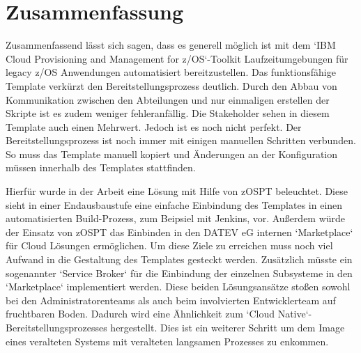 \chapter{Zusammenfassung}\label{ch:zusammenfassung}
Zusammenfassend lässt sich sagen, dass es generell möglich ist mit dem `IBM Cloud Provisioning and Management for z/OS`-Toolkit Laufzeitumgebungen für legacy z/OS Anwendungen automatisiert bereitzustellen.
Das funktionsfähige Template verkürzt den Bereitstellungsprozess deutlich.
Durch den Abbau von Kommunikation zwischen den Abteilungen und nur einmaligen erstellen der Skripte ist es zudem weniger fehleranfällig.
Die Stakeholder sehen in diesem Template auch einen Mehrwert.
Jedoch ist es noch nicht perfekt.
Der Bereitstellungsprozess ist noch immer mit einigen manuellen Schritten verbunden.
So muss das Template manuell kopiert und Änderungen an der Konfiguration müssen innerhalb des Templates stattfinden.

Hierfür wurde in der Arbeit eine Lösung mit Hilfe von zOSPT beleuchtet.
Diese sieht in einer Endausbaustufe eine einfache Einbindung des Templates in einen automatisierten Build-Prozess, zum Beipsiel mit Jenkins, vor.
Außerdem würde der Einsatz von zOSPT das Einbinden in den DATEV eG internen `Marketplace` für Cloud Lösungen ermöglichen.
Um diese Ziele zu erreichen muss noch viel Aufwand in die Gestaltung des Templates gesteckt werden.
Zusätzlich müsste ein sogenannter `Service Broker` für die Einbindung der einzelnen Subsysteme in den `Marketplace` implementiert werden.
Diese beiden Lösungsansätze stoßen sowohl bei den Administratorenteams als auch beim involvierten Entwicklerteam auf fruchtbaren Boden.
Dadurch wird eine Ähnlichkeit zum `Cloud Native`-Bereitstellungsprozesses hergestellt.
Dies ist ein weiterer Schritt um dem Image eines veralteten Systems mit veralteten langsamen Prozesses zu enkommen.  

